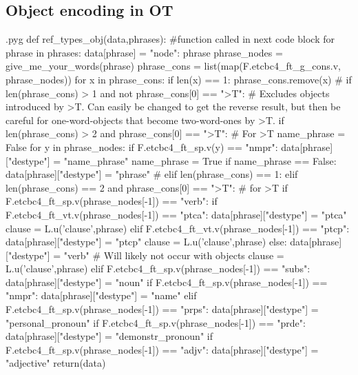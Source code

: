 \documentclass{report}
\makeatletter
\newenvironment{python}{%
  \VerbatimEnvironment
  \minted@resetoptions
  \setkeys{minted@opt}{}
      \begin{VerbatimOut}{\jobname.pyg}}
{%
      \end{VerbatimOut}
      \minted@pygmentize{python}
      \DeleteFile{\jobname.pyg}}
\makeatother
\begin{document}
\subsection{Object encoding in OT}

\begin{python}
def ref_types_obj(data,phrases): #function called in next code block
    for phrase in phrases:
        data[phrase] = {"node": phrase}
        phrase_nodes = give_me_your_words(phrase)
        phrase_cons = list(map(F.etcbc4_ft_g_cons.v, phrase_nodes))
        for x in phrase_cons:
            if len(x) == 1:
                phrase_cons.remove(x)
#            if len(phrase_cons) > 1 and not phrase_cons[0] == ">T": # Excludes objects introduced by >T. Can easily be changed to get the reverse result, but then be careful for one-word-objects that become two-word-ones by >T.
        if len(phrase_cons) > 2 and phrase_cons[0] == ">T": # For >T
            name_phrase = False
            for y in phrase_nodes:
                if F.etcbc4_ft_sp.v(y) == "nmpr":
                    data[phrase]["destype"] = "name_phrase"
                    name_phrase = True
            if name_phrase == False:
                data[phrase]["destype"] = "phrase"
#            elif len(phrase_cons) == 1:
        elif len(phrase_cons) == 2 and phrase_cons[0] == ">T": # for >T
            if F.etcbc4_ft_sp.v(phrase_nodes[-1]) == "verb":
                if F.etcbc4_ft_vt.v(phrase_nodes[-1]) == "ptca":
                    data[phrase]["destype"] = "ptca"
                    clause = L.u('clause',phrase)
                elif F.etcbc4_ft_vt.v(phrase_nodes[-1]) == "ptcp":
                    data[phrase]["destype"] = "ptcp"
                    clause = L.u('clause',phrase)
                else:
                    data[phrase]["destype"] = "verb" # Will likely not occur with objects
                    clause = L.u('clause',phrase)
            elif F.etcbc4_ft_sp.v(phrase_nodes[-1]) == "subs":
                data[phrase]["destype"] = "noun"
            if F.etcbc4_ft_sp.v(phrase_nodes[-1]) == "nmpr":
                data[phrase]["destype"] = "name"
            elif F.etcbc4_ft_sp.v(phrase_nodes[-1]) == "prps":
                data[phrase]["destype"] = "personal_pronoun"
            if F.etcbc4_ft_sp.v(phrase_nodes[-1]) == "prde":
                data[phrase]["destype"] = "demonstr_pronoun"
            if F.etcbc4_ft_sp.v(phrase_nodes[-1]) == "adjv":
                data[phrase]["destype"] = "adjective"
    return(data)
                    

\end{python}
\end{document}
